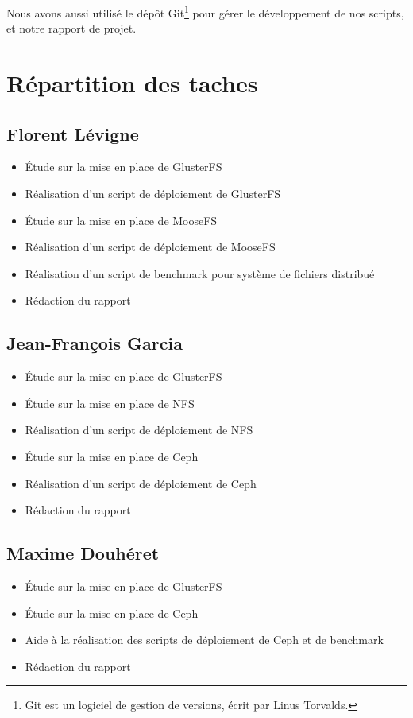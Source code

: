\documentclass[12pt]{report}
\begin{document}
				Nous avons aussi utilisé le dépôt Git\footnote{Git est un logiciel de gestion de versions, écrit par Linus Torvalds.} pour gérer le développement
				de nos scripts, et notre rapport de projet.
\newpage
			\section{Répartition des taches}
				\subsection{Florent Lévigne}
					\begin{itemize}
						\item Étude sur la mise en place de GlusterFS
						\item Réalisation d'un script de déploiement de GlusterFS
						\item Étude sur la mise en place de MooseFS
						\item Réalisation d'un script de déploiement de MooseFS
						\item Réalisation d'un script de benchmark pour système de fichiers distribué
						\item Rédaction du rapport
					\end{itemize}
				\subsection{Jean-François Garcia}
					\begin{itemize}
						\item Étude sur la mise en place de GlusterFS
						\item Étude sur la mise en place de NFS
						\item Réalisation d'un script de déploiement de NFS
						\item Étude sur la mise en place de Ceph
						\item Réalisation d'un script de déploiement de Ceph
						\item Rédaction du rapport
					\end{itemize}
				\subsection{Maxime Douhéret}
					\begin{itemize}
						\item Étude sur la mise en place de GlusterFS
						\item Étude sur la mise en place de Ceph
						\item Aide à la réalisation des scripts de déploiement de Ceph et de benchmark
						\item Rédaction du rapport
					\end{itemize}
\end{document}
